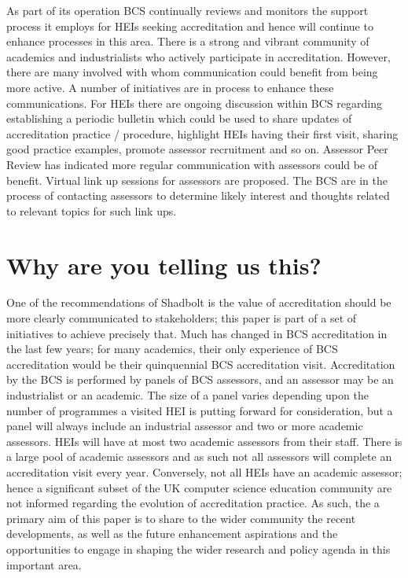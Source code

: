 \documentclass[sigconf]{acmart}
\begin{document}
As part of its operation BCS continually reviews and monitors the support process it employs for HEIs seeking accreditation and hence will continue to enhance processes in this area.
There is a strong and vibrant community of academics and industrialists who actively participate in accreditation. However, there are many involved with whom communication could benefit from being more active. A number of initiatives are in process to enhance these communications. For HEIs there are ongoing discussion within BCS regarding establishing a periodic bulletin which could be used to share updates of accreditation practice / procedure, highlight HEIs having their first visit, sharing good practice examples, promote assessor recruitment and so on. Assessor Peer Review has indicated more regular communication with assessors could be of benefit. Virtual link up sessions for assessors are proposed. The BCS are in the process of contacting assessors to determine likely interest and thoughts related to relevant topics for such link ups.

\section{Why are you telling us this?}	

One of the recommendations of Shadbolt is the value of accreditation
should be more clearly communicated to stakeholders; this paper is
part of a set of initiatives to achieve precisely that.  Much has
changed in BCS accreditation in the last few years; for many academics,
their only experience of BCS accreditation would be their quinquennial BCS
accreditation visit. Accreditation by the BCS is performed by panels
of BCS assessors, and an assessor may be an industrialist or an
academic. The size of a panel varies depending upon the number of
programmes a visited HEI is putting forward for consideration, but a panel
will always include an industrial assessor and two or more academic
assessors. HEIs will have at most two academic assessors from their
staff.  There is a large pool of academic assessors and as such not
all assessors will complete an accreditation visit every
year. Conversely, not all HEIs have an academic assessor; hence a
significant subset of the UK computer science education community are
not informed regarding the evolution of accreditation practice. As
such, the a primary aim of this paper is to share to the wider
community the recent developments, as well as the future enhancement
aspirations and the opportunities to engage in shaping the wider
research and policy agenda in this important area.
\end{document}
